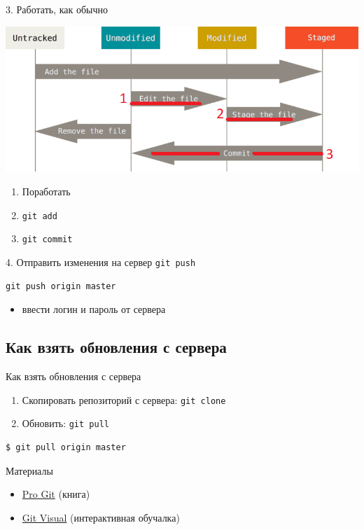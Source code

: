 \documentclass[presentation]{beamer}
\begin{document}
\begin{frame}[fragile,label={sec:org8a12ef0}]{3. Работать, как обычно}
 \begin{center}
\includegraphics[height=0.5\textheight]{./01_vcs_01_git_file_states_02_change.png}
\end{center}

\begin{enumerate}
\item Поработать
\item \texttt{git add}
\item \texttt{git commit}
\end{enumerate}
\end{frame}

\begin{frame}[fragile,label={sec:org638164d}]{4. Отправить изменения на сервер}
 \alert{\texttt{git push}}

\begin{verbatim}
git push origin master
\end{verbatim}

\begin{itemize}
\item ввести логин и пароль от \alert{сервера}
\end{itemize}
\end{frame}

\subsection{Как взять обновления с сервера}
\label{sec:orgbbd4b41}
\begin{frame}[fragile,label={sec:org431cc94}]{Как взять обновления с сервера}
 \begin{enumerate}
\item Скопировать репозиторий с сервера: \texttt{git clone}
\item Обновить: \texttt{git pull}
\end{enumerate}

\begin{verbatim}
$ git pull origin master
\end{verbatim}
\end{frame}

\begin{frame}[label={sec:org3553ebd}]{Материалы}
\begin{itemize}
\item \href{https://git-scm.com/book/ru/v2}{Pro Git} (книга)
\item \href{http://gitvisual.com}{Git Visual} (интерактивная обучалка)
\end{itemize}
\end{frame}
\end{document}
